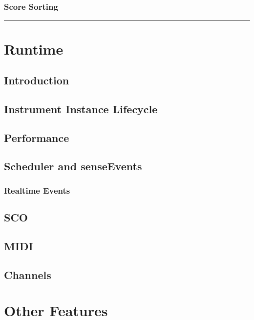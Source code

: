 \documentclass[]{book}
\begin{document}
\subsection{Score Sorting}

\begin{center}\rule{3in}{0.4pt}\end{center}


\chapter{Runtime}

\section{Introduction}

\section{Instrument Instance Lifecycle}

\section{Performance}

\section{Scheduler and senseEvents}

\subsection{Realtime Events}

\section{SCO}

\section{MIDI}

\section{Channels}


\chapter{Other Features}
\end{document}
